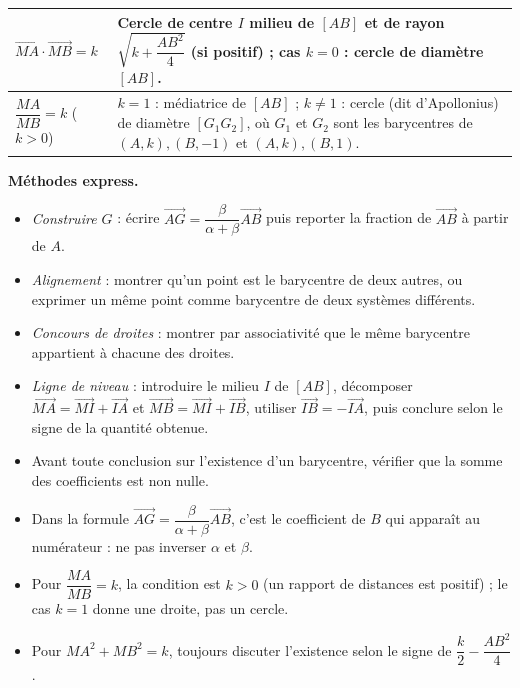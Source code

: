 \documentclass[11pt]{article}
\newcommand{\cle}[1]{{\popxbold\color{popdark}#1}}
\begin{document}
\begin{aretenir}[L'essentiel de la le\c{c}on]
\begin{center}
\begin{tabularx}{\linewidth}{|l|X|}
$\overrightarrow{MA}\cdot\overrightarrow{MB}=k$ & Cercle de centre $I$ milieu de $[AB]$ et de rayon $\sqrt{k+\dfrac{AB^2}{4}}$ (si positif) ; cas $k=0$ : cercle de diam\`etre $[AB]$. \\ \hline
$\dfrac{MA}{MB}=k$ ($k>0$) & $k=1$ : m\'ediatrice de $[AB]$ ; $k\neq 1$ : cercle (dit d'Apollonius) de diam\`etre $[G_1G_2]$, o\`u $G_1$ et $G_2$ sont les barycentres de $(A,k),(B,-1)$ et $(A,k),(B,1)$. \\ \hline
\end{tabularx}
\end{center}
\textbf{M\'ethodes express.}
\begin{itemize}
\item \emph{Construire $G$} : \'ecrire $\overrightarrow{AG}=\dfrac{\beta}{\alpha+\beta}\overrightarrow{AB}$ puis reporter la fraction de $\overrightarrow{AB}$ \`a partir de $A$.
\item \emph{Alignement} : montrer qu'un point est le barycentre de deux autres, ou exprimer un m\^eme point comme barycentre de deux syst\`emes diff\'erents.
\item \emph{Concours de droites} : montrer par associativit\'e que le m\^eme barycentre appartient \`a chacune des droites.
\item \emph{Ligne de niveau} : introduire le milieu $I$ de $[AB]$, d\'ecomposer $\overrightarrow{MA}=\overrightarrow{MI}+\overrightarrow{IA}$ et $\overrightarrow{MB}=\overrightarrow{MI}+\overrightarrow{IB}$, utiliser $\overrightarrow{IB}=-\overrightarrow{IA}$, puis conclure selon le signe de la quantit\'e obtenue.
\end{itemize}
\end{aretenir}

\begin{attention}
\begin{itemize}
\item Avant toute conclusion sur l'existence d'un barycentre, v\'erifier que la \cle{somme des coefficients est non nulle}.
\item Dans la formule $\overrightarrow{AG}=\dfrac{\beta}{\alpha+\beta}\overrightarrow{AB}$, c'est le coefficient de $B$ qui appara\^it au num\'erateur : ne pas inverser $\alpha$ et $\beta$.
\item Pour $\dfrac{MA}{MB}=k$, la condition est $k>0$ (un rapport de distances est positif) ; le cas $k=1$ donne une droite, pas un cercle.
\item Pour $MA^2+MB^2=k$, toujours discuter l'existence selon le signe de $\dfrac{k}{2}-\dfrac{AB^2}{4}$.
\end{itemize}
\end{attention}
\end{document}
